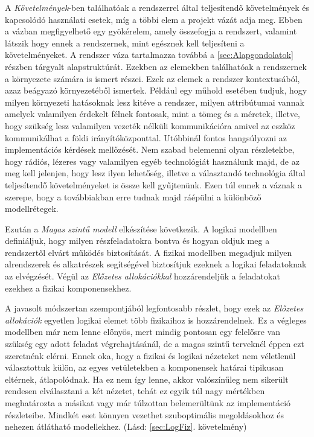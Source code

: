         A \emph{Követelmények}-ben találhatóak a rendszerrel által teljesítendő követelmények és kapcsolódó használati esetek, míg a többi elem a projekt vázát adja meg. Ebben a vázban megfigyelhető egy gyökérelem, amely összefogja a rendszert, valamint látszik hogy ennek a rendszernek, mint egésznek kell teljesíteni a követelményeket.
        A rendszer váza tartalmazza továbbá a \ref{sec:Alapgondolatok} részben tárgyalt alapstruktúrát.
        Ezekben az elemekben találhatóak a rendszernek a környezete számára is ismert részei. Ezek az elemek a rendszer kontextusából, azaz beágyazó környezetéből ismertek.
        Például egy műhold esetében tudjuk, hogy milyen környezeti hatásoknak lesz kitéve a rendszer, milyen attribútumai vannak amelyek valamilyen érdekelt félnek fontosak, mint a tömeg és a méretek, illetve, hogy szükség lesz valamilyen vezeték nélküli kommunikációra amivel az eszköz kommunikálhat a földi irányítóközponttal. Utóbbinál fontos hangsúlyozni az implementációs kérdések mellőzését. Nem szabad belemenni olyan részletekbe, hogy rádiós, lézeres vagy valamilyen egyéb technológiát használunk majd, de az meg kell jelenjen, hogy lesz ilyen lehetőség, illetve a választandó technológia által teljesítendő követelményeket is össze kell gyűjtenünk. 
        Ezen túl ennek a váznak a szerepe, hogy a továbbiakban erre tudnak majd ráépülni a különböző modellrétegek.

        Ezután a \emph{Magas szintű modell} elkészítése következik. A logikai modellben definiáljuk, hogy milyen részfeladatokra bontva és hogyan oldjuk meg a rendszertől elvárt működés biztosítását.
        A fizikai modellben megadjuk milyen alrendszerek és alkatrészek segítségével biztosítjuk ezeknek a logikai feladatoknak az elvégzését.
        Végül az \emph{Előzetes allokációkkal} hozzárendeljük a feladatokat ezekhez a fizikai komponensekhez.
        
        A javasolt módszertan szempontjából legfontosabb részlet, hogy ezek az \emph{Előzetes allokációk} egyetlen logikai elemet több fizikaihoz is hozzárendelnek. Ez a végleges modellben már nem lenne előnyös, mert mindig pontosan egy felelősre van szükség egy adott feladat végrehajtásánál, de a magas szintű terveknél éppen ezt szeretnénk elérni.
        Ennek oka, hogy a fizikai és logikai nézeteket nem véletlenül választottuk külön, az egyes vetületekben a komponensek határai tipikusan eltérnek, átlapolódnak.
        Ha ez nem így lenne, akkor valószínűleg nem sikerült rendesen elválasztani a két nézetet, tehát ez egyik túl nagy mértékben meghatározta a másikat vagy már túlzottan belemerültünk az implementáció részleteibe. Mindkét eset könnyen vezethet szuboptimális megoldásokhoz és nehezen átlátható modellekhez. (Lásd: \ref{sec:LogFiz}. követelmény)
        
